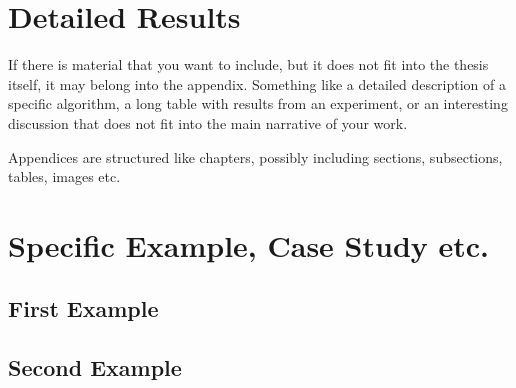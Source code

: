 \chapter{Detailed Results}

If there is material that you want to include, but it does not fit into the thesis itself, it may belong into the appendix.
Something like a detailed description of a specific algorithm, a long table with results from an experiment, or an interesting discussion that does not fit into the main narrative of your work.

Appendices are structured like chapters, possibly including sections, subsections, tables, images etc.

\chapter{Specific Example, Case Study etc.}

\section{First Example}
\lipsum[1]

\section{Second Example}
\lipsum[2]